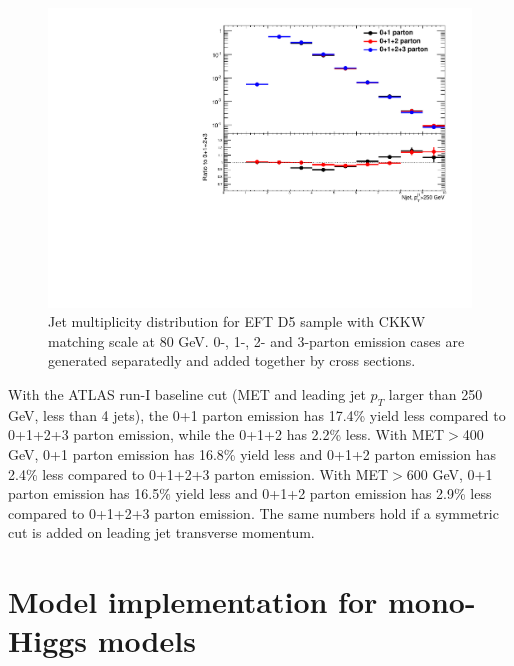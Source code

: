 \begin{figure}[h!]
	\centering  
	\includegraphics[width=0.8\linewidth]{figures/monojet_appendix/h_njet250.pdf}
	\caption{Jet multiplicity distribution for EFT D5 sample with CKKW matching scale at 80 GeV. 0-, 1-, 2- and 3-parton emission cases are generated separatedly and added together by cross sections.}
	\label{fig:RatioKine_D5_2}
\end{figure}

With the ATLAS run-I baseline cut (MET and leading jet $p_{T}$ larger than 250 GeV, less than 4 jets), the 0+1 parton emission has 17.4\% yield less compared to 0+1+2+3 parton emission, while the 0+1+2 has 2.2\% less. With MET$>$400 GeV, 0+1 parton emission has 16.8\% yield less and 0+1+2 parton emission has 2.4\% less compared to 0+1+2+3 parton emission. With MET$>$600 GeV, 0+1 parton emission has 16.5\% yield less and 0+1+2 parton emission has 2.9\% less compared to 0+1+2+3 parton emission. The same numbers hold if a symmetric cut is added on leading jet transverse momentum.


\section{Model implementation for mono-Higgs models}

